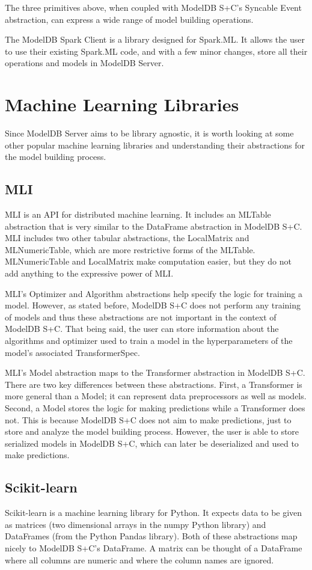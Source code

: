 The three primitives above, when coupled with ModelDB S+C's Syncable Event abstraction, can express a wide range
of model building operations.

The ModelDB Spark Client is a library designed for Spark.ML. It allows the user to use their existing
Spark.ML code, and with a few minor changes, store all their operations and models in ModelDB Server. 

\section{Machine Learning Libraries}
Since ModelDB Server aims to be library agnostic, it is worth looking at some other popular
machine learning libraries and understanding their abstractions for the model building process.

\subsection{MLI}
MLI \cite{mli} is an API for distributed machine learning. It includes an MLTable abstraction
that is very similar to the DataFrame abstraction in ModelDB S+C. MLI includes two other
tabular abstractions, the LocalMatrix and MLNumericTable, which are more restrictive forms of the
MLTable. MLNumericTable and LocalMatrix make computation easier, but they do not add anything to
the expressive power of MLI.

MLI's Optimizer and Algorithm abstractions help specify the logic for training a model. However,
as stated before, ModelDB S+C does not perform any training of models and thus these abstractions
are not important in the context of ModelDB S+C. That being said, the user can store information
about the algorithms and optimizer used to train a model in the hyperparameters of the model's associated
TransformerSpec.

MLI's Model abstraction maps to the Transformer abstraction in ModelDB S+C. There are two 
key differences between these abstractions. First, a Transformer is more general 
than a Model; it can represent data preprocessors as well as models. Second, a Model
stores the logic for making predictions while a Transformer does not. This is because
ModelDB S+C does not aim to make predictions, just to store and analyze the model building process. However,
the user is able to store serialized models in ModelDB S+C, which can later be deserialized and used to make
predictions.

\subsection{Scikit-learn}
Scikit-learn \cite{scikitlearn} is a machine learning library for Python. It expects data to
be given as matrices (two dimensional arrays in the numpy Python library) and DataFrames (from the Python
Pandas library). Both of these abstractions map nicely to ModelDB S+C's DataFrame.
A matrix can be thought of a DataFrame where all columns are numeric and where the column names are ignored.

